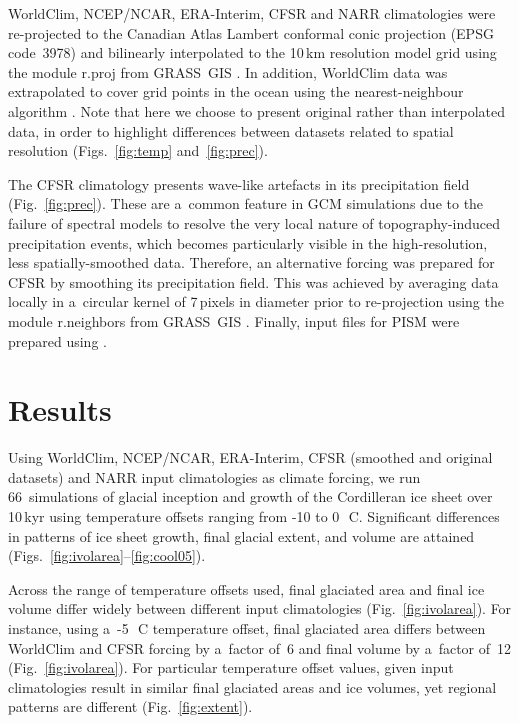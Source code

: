 \documentclass[tc, ms]{copernicus}
\begin{document}
WorldClim, NCEP/NCAR, ERA-Interim, CFSR and NARR climatologies were re-projected to the Canadian Atlas Lambert conformal conic projection (EPSG code~3978) and bilinearly interpolated to the 10\,km resolution model grid using the module r.proj from GRASS~GIS \citep{soft:grass}. In addition, WorldClim data was extrapolated to cover grid points in the ocean using the nearest-neighbour algorithm \citep{soft:scipy}. Note that here we choose to present original rather than interpolated data, in order to highlight differences between datasets related to spatial resolution (Figs.~\ref{fig:temp} and~\ref{fig:prec}).

The CFSR climatology presents wave-like artefacts in its precipitation field (Fig.~\ref{fig:prec}). These are a~common feature in GCM simulations due to the failure of spectral models to resolve the very local nature of topography-induced precipitation events, which becomes particularly visible in the high-resolution, less spatially-smoothed data. Therefore, an alternative forcing was prepared for CFSR by smoothing its precipitation field. This was achieved by averaging data locally in a~circular kernel of 7\,pixels in diameter prior to re-projection using the module r.neighbors from GRASS~GIS \citep{soft:grass}. Finally, input files for PISM were prepared using \citet{web:nc4py}.

\section{Results}
\label{sec:results}

Using WorldClim, NCEP/NCAR, ERA-Interim, CFSR (smoothed and original datasets) and NARR input climatologies as climate forcing, we run 66~simulations of glacial inception and growth of the Cordilleran ice sheet over 10\,kyr using temperature offsets ranging from -10 to 0\,\unit{{\degree}C}. Significant differences in patterns of ice sheet growth, final glacial extent, and volume are attained (Figs.~\ref{fig:ivolarea}--\ref{fig:cool05}).

Across the range of temperature offsets used, final glaciated area and final ice volume differ widely between different input climatologies (Fig.~\ref{fig:ivolarea}). For instance, using a~-5\,\unit{{\degree}C} temperature offset, final glaciated area differs between WorldClim and CFSR forcing by a~factor of~6 and final volume by a~factor of~12 (Fig.~\ref{fig:ivolarea}). For particular temperature offset values, given input climatologies result in similar final glaciated areas and ice volumes, yet regional patterns are different (Fig.~\ref{fig:extent}).
\end{document}
